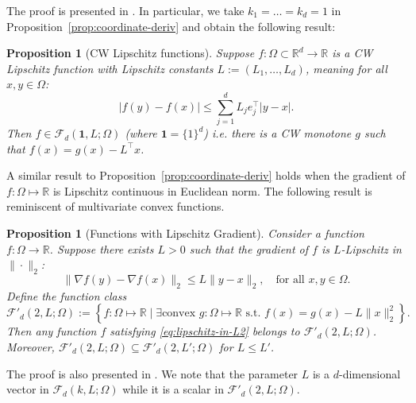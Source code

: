 \documentclass[12pt]{article}
\newtheorem{proposition}[theorem]{Proposition}
\begin{document}
The proof is presented in . In particular, we take $k_1 = \ldots = k_d = 1$ in Proposition~\ref{prop:coordinate-deriv} and obtain the following result:
\begin{proposition}[CW Lipschitz functions]\label{example1}
Suppose $f : \Omega\subset\mathbb{R}^d\rightarrow \mathbb{R}$ is a CW Lipschitz function with Lipschitz constants $L := (L_1, \ldots, L_d)$, meaning for all $x, y\in\Omega$:
\begin{equation*}
\left|f(y)-f(x)\right| \leq \sum_{j=1}^d L_je_j^\top |y-x|.
\end{equation*}
Then $f \in \mathcal{F}_d(\mathbf{1},L; \Omega)$ (where $\mathbf{1} = \{1\}^d$) i.e. there is a CW monotone $g$ such that $f(x) = g(x) - L^\top x$.
\end{proposition}

A similar result to Proposition~\ref{prop:coordinate-deriv} holds when the gradient of $f: \Omega \mapsto \mathbb{R}$ is Lipschitz continuous in Euclidean norm. The following result is reminiscent of multivariate convex functions.

\begin{proposition}[Functions with Lipschitz Gradient]\label{prop:multivariate-convex} Consider a function $f : \Omega \to \mathbb{R}$. Suppose there exists $L > 0$ such that the gradient of $f$ is $L$-Lipschitz in $\|\cdot\|_2$: \begin{equation}\label{eq:lipschitz-in-L2} \|\nabla f(y) - \nabla f(x)\|_2 \leq L \|y - x\|_2, \quad \text{for all } x, y \in \Omega. \end{equation} Define the function class 
\begin{equation*}
\mathcal{F}'_d(2, L; \Omega) := \left\{f: \Omega \mapsto \mathbb{R}\mid \exists \text{convex } g: \Omega \mapsto \mathbb{R} \text{ s.t. } f(x) = g(x) - L \|x\|_2^2 \right\}. 
\end{equation*} Then any function $f$ satisfying \eqref{eq:lipschitz-in-L2} belongs to $\mathcal{F}'_d(2, L; \Omega)$. Moreover, $\mathcal{F}'_d(2, L; \Omega) \subseteq \mathcal{F}'_d(2, L'; \Omega)$ for $L \leq L'$.
\end{proposition}

The proof is also presented in . We note that the parameter $L$ is a $d$-dimensional vector in $\mathcal{F}_d(k, L; \Omega)$ while it is a scalar in $\mathcal{F}'_d(2, L; \Omega)$. 
\end{document}
